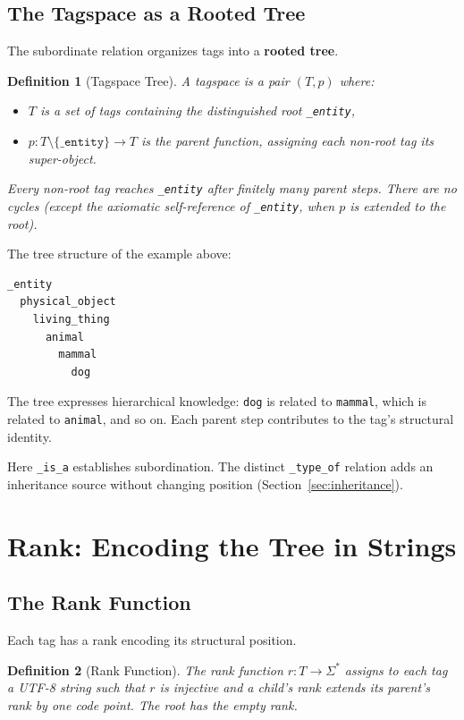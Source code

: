 \documentclass{article}
\newtheorem{definition}{Definition}[section]
\begin{document}
\subsection{The Tagspace as a Rooted Tree}

The subordinate relation organizes tags into a \textbf{rooted tree}.

\begin{definition}[Tagspace Tree]
A tagspace is a pair $(T, p)$ where:
\begin{itemize}
  \item $T$ is a set of tags containing the distinguished root
        \texttt{\_entity},
  \item $p : T \setminus \{\texttt{\_entity}\} \to T$ is the \emph{parent
        function}, assigning each non-root tag its super-object.
\end{itemize}
Every non-root tag reaches \texttt{\_entity} after finitely many parent
steps. There are no cycles (except the axiomatic self-reference of
\texttt{\_entity}, when $p$ is extended to the root).
\end{definition}

The tree structure of the example above:
\begin{verbatim}
_entity
  physical_object
    living_thing
      animal
        mammal
          dog
\end{verbatim}

The tree expresses hierarchical knowledge: \texttt{dog} is related to
\texttt{mammal}, which is related to \texttt{animal}, and so on. Each
parent step contributes to the tag's structural identity.

Here \texttt{\_is\_a} establishes subordination. The distinct
\texttt{\_type\_of} relation adds an inheritance source without changing
position (Section~\ref{sec:inheritance}).

\section{Rank: Encoding the Tree in Strings}

\subsection{The Rank Function}

Each tag has a rank encoding its structural position.

\begin{definition}[Rank Function]
The rank function $r : T \to \Sigma^*$ assigns to each tag a UTF-8 string
such that $r$ is injective and a child's rank extends its parent's rank by
one code point. The root has the empty rank.
\end{definition}
\end{document}
